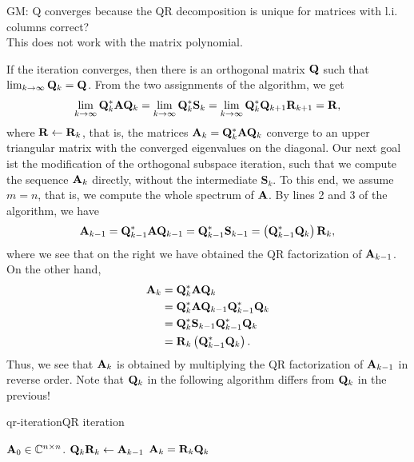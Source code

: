 \begin{todo}
  GM:
  Q converges because the QR decomposition is unique for matrices with l.i. columns correct? \\
  This does not work with the matrix polynomial.
\end{todo}
\begin{remark}
  If the iteration converges, then there is an orthogonal matrix $\mathbf Q$ such that $\lim_{k \to
  \infty} \mathbf Q_k = \mathbf Q$.
  From the two assignments of the algorithm, we get
  \begin{gather}
    \lim_{k \to \infty} \mathbf Q_k^* \mathbf A \mathbf Q_k = \lim_{k \to \infty} \mathbf Q_k^* \mathbf{S}_k = \lim_{k \to \infty}
    \mathbf Q_k^*\mathbf Q_{k+1}\mathbf R_{k+1} = \mathbf R,
  \end{gather}
  where $\mathbf R\leftarrow\mathbf R_k$, that is, the matrices
  $\mathbf A_k = \mathbf Q_k^*\mathbf A\mathbf Q_k$ converge to an upper triangular
  matrix with the converged eigenvalues on the diagonal. Our next goal
  ist the modification of the orthogonal subspace iteration, such that
  we compute the sequence $\mathbf A_k$ directly, without the intermediate
  $\mathbf{S}_k$. To this end, we assume $m=n$, that is, we compute the
  whole spectrum of $\mathbf A$. By lines 2 and 3 of the algorithm, we have
  \begin{gather*}
    \mathbf A_{k-1} = \mathbf Q_{k-1}^*\mathbf A\mathbf Q_{k-1} = \mathbf Q_{k-1}^* \mathbf{S}_{k-1} = \left(\mathbf Q_{k-1}^*\mathbf Q_{k}\right)\mathbf R_k,
  \end{gather*}
  where we see that on the right we have obtained the QR factorization of $\mathbf A_{k-1}$.
  On the other hand,
  \begin{align*}
    \mathbf A_k
    &= \mathbf Q_k^*\mathbf A\mathbf Q_k\\
    &= \mathbf Q_k^*\mathbf A\mathbf Q_{k-1}\mathbf Q_{k-1}^*\mathbf Q_k\\
    &= \mathbf Q_k^*\mathbf{S}_{k-1} \mathbf Q_{k-1}^*\mathbf Q_k\\
    &= \mathbf R_k \left(\mathbf Q_{k-1}^*\mathbf Q_k\right).
  \end{align*}
  Thus, we see that $\mathbf A_k$ is obtained by multiplying the QR
  factorization of $\mathbf A_{k-1}$ in reverse order. Note that $\mathbf Q_k$
  in the following algorithm differs from $\mathbf Q_k$ in the previous!
\end{remark}

\begin{Algorithm*}{qr-iteration}{QR iteration}
  \begin{algorithmic}[1]
    \Require $\mathbf A_0\in\mathbb C^{n\times n}$.
    \State $\mathbf Q_k\mathbf R_k \gets \mathbf A_{k-1}$ 
    \State $\mathbf A_{k} = \mathbf R_k\mathbf Q_k$
    \EndFor
  \end{algorithmic}
\end{Algorithm*}

